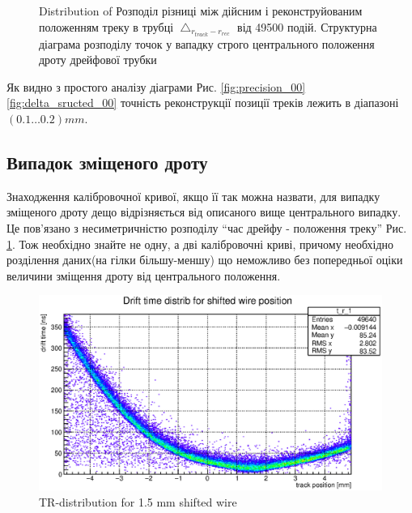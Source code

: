 \documentclass[]{article}
\begin{document}
	\begin{figure}[h]
	\centering
		\qquad
		\caption{Distribution of Розподіл різниці між дійсним і реконструйованим положенням треку в трубці $\bigtriangleup_{r_{track} - r_{rec}}$ від 49500 подій. Структурна діаграма розподілу точок у вападку строго центрального положення дроту дрейфової трубки}
	\end{figure}
	
	Як видно з простого аналізу діаграми Рис. \ref{fig:precision_00} \ref{fig:delta_sructed_00} точність реконструкції позиції треків лежить в діапазоні $(0.1 \dots 0.2) mm$. 
	
	\subsection{Випадок зміщеного дроту}
	Знаходження калібровочної кривої, якщо її так можна назвати, для випадку зміщеного дроту дещо відрізняється від описаного вище центрального випадку. Це пов’язано з несиметричністю розподілу ``час дрейфу - положення треку'' Рис. \ref{fig:tr_distr_15}. Тож необхідно знайте не одну, а дві калібровочні криві, причому необхідно розділення даних(на гілки більшу-меншу) що неможливо без попередньої оціки величини зміщення дроту від центрального положення.
	
	\begin{figure}
		\centering
		\includegraphics[width = \textwidth]{tr_distr_15.eps}
		\caption{TR-distribution for 1.5 mm shifted wire}
		\label{fig:tr_distr_15}
	\end{figure}
	
\end{document}
